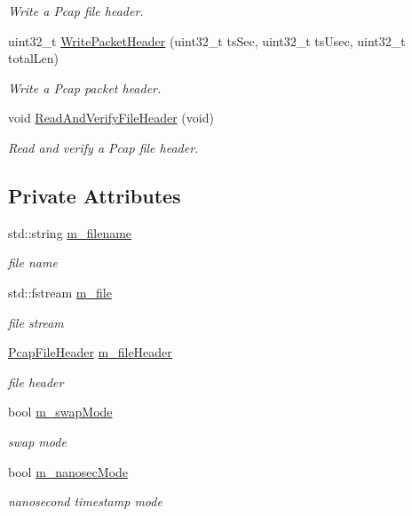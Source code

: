 \begin{DoxyCompactItemize}
\begin{DoxyCompactList}\small\item\em Write a Pcap file header. \end{DoxyCompactList}\item 
uint32\+\_\+t \hyperlink{classns3_1_1PcapFile_a49675e170416ab1665fea6883250bda3}{Write\+Packet\+Header} (uint32\+\_\+t ts\+Sec, uint32\+\_\+t ts\+Usec, uint32\+\_\+t total\+Len)
\begin{DoxyCompactList}\small\item\em Write a Pcap packet header. \end{DoxyCompactList}\item 
void \hyperlink{classns3_1_1PcapFile_aa73a9f58350e911c34bdac1071e60e10}{Read\+And\+Verify\+File\+Header} (void)
\begin{DoxyCompactList}\small\item\em Read and verify a Pcap file header. \end{DoxyCompactList}\end{DoxyCompactItemize}
\subsection*{Private Attributes}
\begin{DoxyCompactItemize}
\item 
std\+::string \hyperlink{classns3_1_1PcapFile_a352f69f3045f8e1ebbc42ab5ab540b68}{m\+\_\+filename}
\begin{DoxyCompactList}\small\item\em file name \end{DoxyCompactList}\item 
std\+::fstream \hyperlink{classns3_1_1PcapFile_ac8ecc2d37ff1e2a5148901e10f855c26}{m\+\_\+file}
\begin{DoxyCompactList}\small\item\em file stream \end{DoxyCompactList}\item 
\hyperlink{structns3_1_1PcapFile_1_1PcapFileHeader}{Pcap\+File\+Header} \hyperlink{classns3_1_1PcapFile_a44261d9566e738203968f357584e268c}{m\+\_\+file\+Header}
\begin{DoxyCompactList}\small\item\em file header \end{DoxyCompactList}\item 
bool \hyperlink{classns3_1_1PcapFile_a179acfdfb216038a20ddb8cdc5fe182d}{m\+\_\+swap\+Mode}
\begin{DoxyCompactList}\small\item\em swap mode \end{DoxyCompactList}\item 
bool \hyperlink{classns3_1_1PcapFile_ac4c31785ef8fe52e33615f5ee33cacf8}{m\+\_\+nanosec\+Mode}
\begin{DoxyCompactList}\small\item\em nanosecond timestamp mode \end{DoxyCompactList}\end{DoxyCompactItemize}


